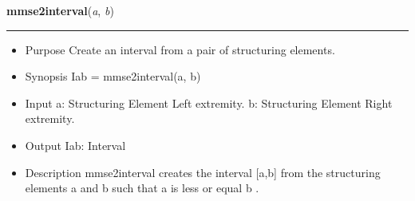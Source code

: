     \label{multireg:num_pymorph:mmse2interval}
    \vspace{0.5ex}

    \begin{boxedminipage}{\textwidth}

    \raggedright \textbf{mmse2interval}(\textit{a}, \textit{b})

    \vspace{-1.5ex}

    \rule{\textwidth}{0.5\fboxrule}
    \begin{itemize}
    \setlength{\parskip}{0.6ex}
      \item Purpose Create an interval from a pair of structuring elements.

      \item Synopsis Iab = mmse2interval(a, b)

      \item Input a: Structuring Element Left extremity. b: Structuring 
        Element Right extremity.

      \item Output Iab: Interval

      \item Description mmse2interval creates the interval [a,b] from the 
        structuring elements a and b such that a is less or equal b .

    \end{itemize}

    \vspace{1ex}

    \end{boxedminipage}

    \label{multireg:num_pymorph:mmsebox}
    \vspace{0.5ex}

